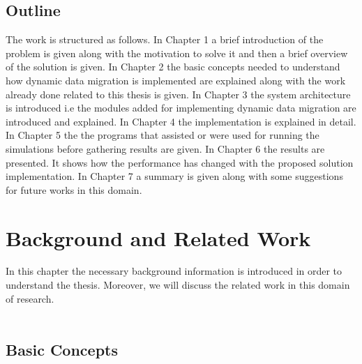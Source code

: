 \documentclass{listhesis}
\begin{document}
\section{Outline}
The work is structured as follows. In Chapter 1 a brief introduction of the problem is given along with the motivation to solve it and then a brief overview of the solution is given.
In Chapter 2 the basic concepts needed to understand how dynamic data migration is implemented are explained along with the work already done related to this thesis is given. In Chapter 3 the system architecture is introduced i.e the modules added for implementing dynamic data migration are introduced and explained. In Chapter 4 the implementation is explained in detail. In Chapter 5 the the programs that assisted or were used for running the simulations before gathering results are given. In Chapter 6 the results are presented. It shows how the performance has changed with the proposed solution implementation. In Chapter 7 a summary is given along with some suggestions for future works in this domain. 
\chapter{Background and Related Work}
In this chapter the necessary background information is introduced in order to understand the thesis. Moreover, we will discuss the related work in this domain of research.\\
\\
\section{Basic Concepts}
\end{document}
